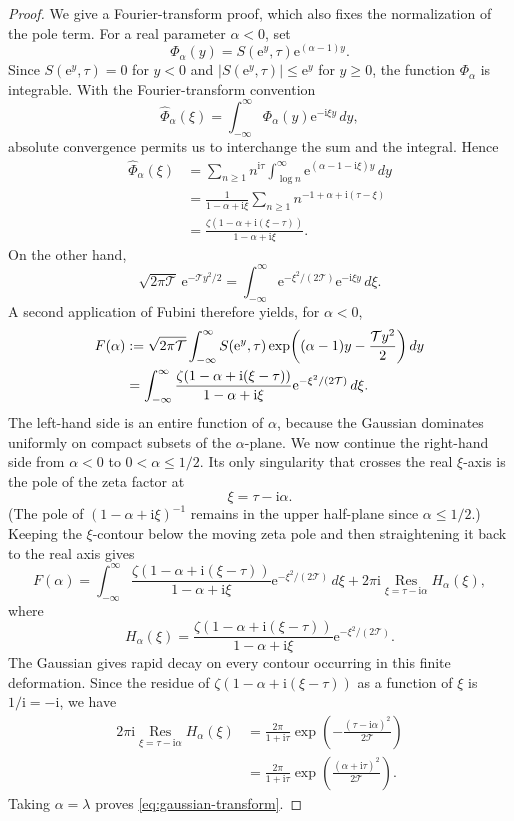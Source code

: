 \documentclass[12pt,reqno]{amsart}
\theoremstyle{remark}
\numberwithin{equation}{section}
\newcommand{\e}{\mathrm e}
\newcommand{\ii}{\mathrm i}
\begin{document}
\begin{proof}
We give a Fourier-transform proof, which also fixes the normalization of the pole term.  For a real parameter $\alpha<0$, set
\[
\Phi_\alpha(y)=S(\e^y,\tau)\e^{(\alpha-1)y}.
\]
Since $S(\e^y,\tau)=0$ for $y<0$ and $|S(\e^y,\tau)|\le \e^y$ for $y\ge0$, the function $\Phi_\alpha$ is integrable.  With the Fourier-transform convention
\[
\widehat \Phi_\alpha(\xi)
=\int_{-\infty}^{\infty}\Phi_\alpha(y)\e^{-\ii\xi y}\,dy,
\]
absolute convergence permits us to interchange the sum and the integral.  Hence
\begin{align*}
\widehat \Phi_\alpha(\xi)
&=\sum_{n\ge1}n^{\ii\tau}
  \int_{\log n}^{\infty}
  \e^{(\alpha-1-\ii\xi)y}\,dy\\
&=\frac{1}{1-\alpha+\ii\xi}
  \sum_{n\ge1}n^{-1+\alpha+\ii(\tau-\xi)}\\
&=\frac{\zeta(1-\alpha+\ii(\xi-\tau))}
        {1-\alpha+\ii\xi}.
\end{align*}
On the other hand,
\[
\sqrt{2\pi\mathcal T}\,
\e^{-\mathcal T y^2/2}
=
\int_{-\infty}^{\infty}
\e^{-\xi^2/(2\mathcal T)}\e^{-\ii\xi y}\,d\xi.
\]
A second application of Fubini therefore yields, for $\alpha<0$,
\begin{align}
F(\alpha)
&:=\sqrt{2\pi\mathcal T}
\int_{-\infty}^{\infty}
S(\e^y,\tau)
\exp\!\left((\alpha-1)y-\frac{\mathcal T y^2}{2}\right)dy \notag\\
&=\int_{-\infty}^{\infty}
\frac{\zeta(1-\alpha+\ii(\xi-\tau))}
     {1-\alpha+\ii\xi}
\e^{-\xi^2/(2\mathcal T)}\,d\xi.
\label{eq:gaussian-alpha-negative}
\end{align}
The left-hand side is an entire function of $\alpha$, because the Gaussian dominates uniformly on compact subsets of the $\alpha$-plane.  We now continue the right-hand side from $\alpha<0$ to $0<\alpha\le1/2$.  Its only singularity that crosses the real $\xi$-axis is the pole of the zeta factor at
\[
\xi=\tau-\ii\alpha.
\]
(The pole of $(1-\alpha+\ii\xi)^{-1}$ remains in the upper half-plane since $\alpha\le1/2$.)  Keeping the $\xi$-contour below the moving zeta pole and then straightening it back to the real axis gives
\[
F(\alpha)
=
\int_{-\infty}^{\infty}
\frac{\zeta(1-\alpha+\ii(\xi-\tau))}
     {1-\alpha+\ii\xi}
\e^{-\xi^2/(2\mathcal T)}\,d\xi
+2\pi\ii\operatorname*{Res}_{\xi=\tau-\ii\alpha}H_\alpha(\xi),
\]
where
\[
H_\alpha(\xi)=
\frac{\zeta(1-\alpha+\ii(\xi-\tau))}
     {1-\alpha+\ii\xi}
\e^{-\xi^2/(2\mathcal T)}.
\]
The Gaussian gives rapid decay on every contour occurring in this finite deformation.  Since the residue of $\zeta(1-\alpha+\ii(\xi-\tau))$ as a function of $\xi$ is $1/\ii=-\ii$, we have
\begin{align*}
2\pi\ii\operatorname*{Res}_{\xi=\tau-\ii\alpha}H_\alpha(\xi)
&=\frac{2\pi}{1+\ii\tau}
  \exp\!\left(-\frac{(\tau-\ii\alpha)^2}{2\mathcal T}\right)\\
&=\frac{2\pi}{1+\ii\tau}
  \exp\!\left(\frac{(\alpha+\ii\tau)^2}{2\mathcal T}\right).
\end{align*}
Taking $\alpha=\lambda$ proves \eqref{eq:gaussian-transform}.
\end{proof}
\end{document}
